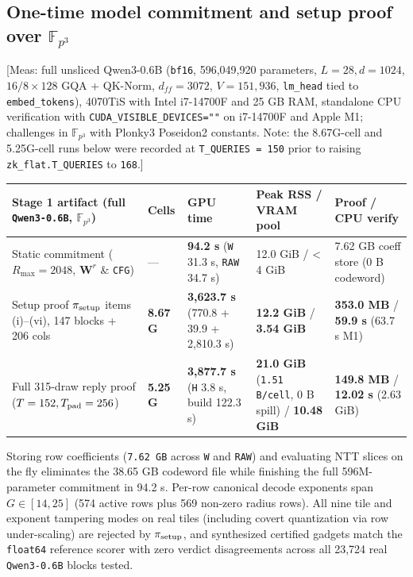 \documentclass[10pt]{article}
\begin{document}
\subsection{One-time model commitment and setup proof over $\mathbb F_{p^3}$}
[Meas: full unsliced Qwen3-0.6B (\texttt{bf16}, 596,049,920 parameters, $L=28, d=1024$, $16/8\times 128$ GQA + QK-Norm, $d_{ff}=3072$, $V=151{,}936$, \texttt{lm\_\allowbreak{}head} tied to \texttt{embed\_\allowbreak{}tokens}), 4070TiS with Intel i7-14700F and 25 GB RAM, standalone CPU verification with \texttt{CUDA\_\allowbreak{}VISIBLE\_\allowbreak{}DEVICES=""} on i7-14700F and Apple M1; challenges in $\mathbb F_{p^3}$ with Plonky3 Poseidon2 constants. Note: the 8.67G-cell and 5.25G-cell runs below were recorded at \texttt{T\_\allowbreak{}QUERIES = 150} prior to raising \texttt{zk\_\allowbreak{}flat.\allowbreak{}T\_\allowbreak{}QUERIES} to \texttt{168}.]

\begin{center}\small
\begin{tabularx}{\linewidth}{YYYYY}
\toprule
{}\textbf{Stage 1 artifact (full \texttt{Qwen3-0.\allowbreak{}6B}, $\mathbb F_{p^3}$)} & {}\textbf{Cells} & {}\textbf{GPU time} & {}\textbf{Peak RSS / VRAM pool} & {}\textbf{Proof / CPU verify} \\
\midrule
{}Static commitment ($R_{\max}=2048$, $\mathbf W^r$ \& \texttt{CFG}) & {}--- & {}\textbf{94.2 s} (\texttt{W} 31.3 s, \texttt{RAW} 34.7 s) & {}12.0 GiB / < 4 GiB & {}7.62 GB coeff store (0 B codeword) \\
{}Setup proof $\pi_{\rm setup}$ items (i)--(vi), 147 blocks + 206 cols & {}\textbf{8.67 G} & {}\textbf{3,623.7 s} (770.8 + 39.9 + 2,810.3 s) & {}\textbf{12.2 GiB} / \textbf{3.54 GiB} & {}\textbf{353.0 MB} / \textbf{59.9 s} (63.7 s M1) \\
{}Full 315-draw reply proof ($T=152, T_{\rm pad}=256$) & {}\textbf{5.25 G} & {}\textbf{3,877.7 s} (\texttt{H} 3.8 s, build 122.3 s) & {}\textbf{21.0 GiB} (\texttt{1.\allowbreak{}51 B/cell}, 0 B spill) / \textbf{10.48 GiB} & {}\textbf{149.8 MB} / \textbf{12.02 s} (2.63 GiB) \\
\bottomrule
\end{tabularx}
\end{center}

Storing row coefficients (\texttt{7.\allowbreak{}62 GB} across \texttt{W} and \texttt{RAW}) and evaluating NTT slices on the fly eliminates the 38.65 GB codeword file while finishing the full 596M-parameter commitment in 94.2 s. Per-row canonical decode exponents span $G\in[14,25]$ (574 active rows plus 569 non-zero radius rows). All nine tile and exponent tampering modes on real tiles (including covert quantization via row under-scaling) are rejected by $\pi_{\rm setup}$, and synthesized certified gadgets match the \texttt{float64} reference scorer with zero verdict disagreements across all 23,724 real \texttt{Qwen3-0.\allowbreak{}6B} blocks tested.
\end{document}
